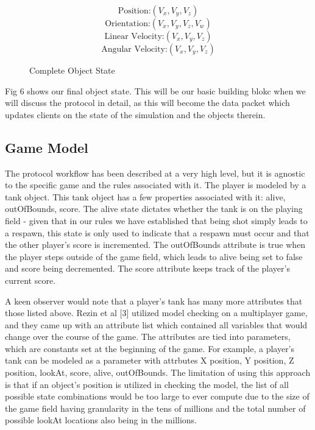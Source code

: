 \documentclass[conference]{IEEEtran}
\begin{document}
\begin{figure}[htbp]
\begin{equation}
\text {Position:} (V_{x}, V_{y}, V_{z})
\end{equation}
\begin{equation}
\text {Orientation:} (V_{x}, V_{y}, V_{z}, V_{w})
\end{equation}
\begin{equation}
\text {Linear Velocity:} (V_{x}, V_{y}, V_{z})
\end{equation}
\begin{equation}
\text {Angular Velocity:} (V_{x}, V_{y}, V_{z})
\end{equation}
\caption{Complete Object State}
\end{figure}

Fig 6 shows our final object state. This will be our basic building blokc when we will discuss the protocol in detail,
as this will become the data packet which updates clients on the state of the simulation and the objects therein.

\subsection{Game Model}

The protocol workflow has been described at a very high level, but it is agnostic to the specific game and the rules associated with it. The
player is modeled by a tank object. This tank object has a few properties associated with it: alive, outOfBounds, score. The alive state
dictates whether the tank is on the playing field - given that in our rules we have established that being shot simply leads to a respawn,
this state is only used to indicate that a respawn must occur and that the other player's score is incremented. The outOfBounds attribute is true
when the player steps outside of the game field, which leads to alive being set to false and score being decremented. The score attribute
keeps track of the player's current score.

A keen observer would note that a player's tank has many more attributes that those listed above. Rezin et al [3] utilized model checking
on a multiplayer game, and they came up with an attribute list which contained all variables that would change over the course of the game.
The attributes are tied into parameters, which are constants set at the beginning of the game. For example, a player's tank can be modeled
as a parameter with attrbutes X position, Y position, Z position, lookAt, score, alive, outOfBounds. The limitation of using this approach is that
if an object's position is utilized in checking the model, the list of all possible state combinations would be too large to ever compute due
to the size of the game field having granularity in the tens of millions and the total number of possible lookAt locations also being in the millions.
\end{document}
